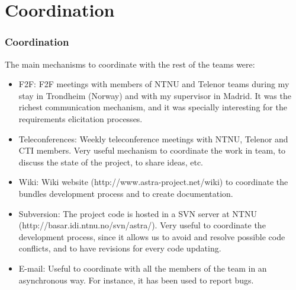 \section{Coordination}

\begin{frame}
	\frametitle{Coordination} 
	The main mechanisms to coordinate with the rest of the teams were:
	\begin{itemize}
	  \item F2F: F2F meetings with members of  NTNU and Telenor teams during my
	  stay in Trondheim (Norway) and with my supervisor in Madrid. It was the
	  richest communication mechanism, and it was specially interesting for the
	  requirements elicitation processes.
	  \item Teleconferences: Weekly teleconference meetings with NTNU,
	  Telenor and CTI members. Very useful mechanism to coordinate 
	  the work in team, to discuss the state of the project, to share ideas, etc.
	  \item Wiki: Wiki website (http://www.astra-project.net/wiki)
	  to coordinate the bundles development process and to create documentation.
	\end{itemize}

\end{frame}


\begin{frame}

	\begin{itemize}

	  \item Subversion: The project code is hosted in a SVN server at NTNU
	  (http://basar.idi.ntnu.no/svn/astra/). Very useful to
	  coordinate the development process, since it allows us to avoid and resolve 
	  possible code conflicts, and to have revisions for every code updating.
	  \item E-mail: Useful to coordinate with all the members of the team
	  in an asynchronous way. For instance, it has been used to report bugs.
	\end{itemize}

\end{frame}
